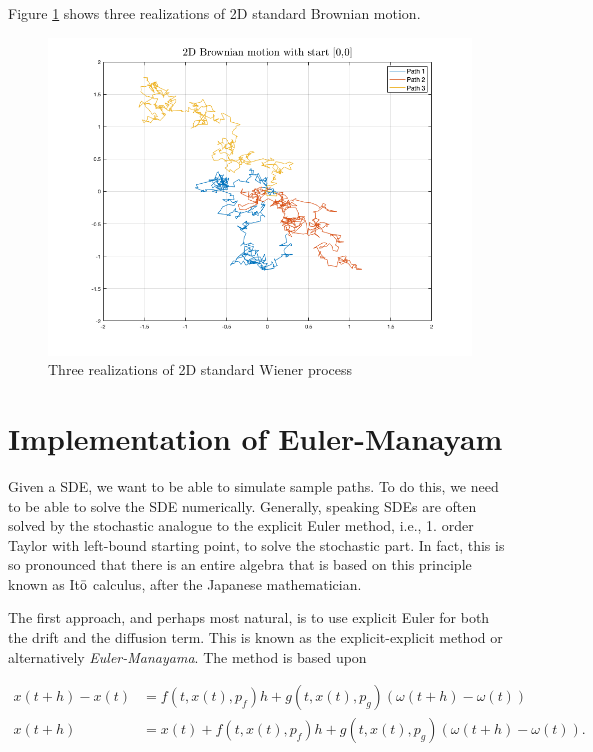 Figure \ref{fig4:2dBM} shows three realizations of 2D standard Brownian motion. 

\begin{figure}[H]
    \centering
    \includegraphics[width=\textwidth]{graphics/opg4/2dBM.png}
    \caption{Three realizations of 2D standard Wiener process}
    \label{fig4:2dBM}
\end{figure}



\section{Implementation of Euler-Manayam}
Given a SDE, we want to be able to simulate sample paths. To do this, we need to be able to solve the SDE numerically. Generally, speaking SDEs are often solved by the stochastic analogue to the explicit Euler method, i.e., 1. order Taylor with left-bound starting point, to solve the stochastic part. In fact, this is so pronounced that there is an entire algebra that is based on this principle known as It$\Bar{\text{o}}$ calculus, after the Japanese mathematician. 

The first approach, and perhaps most natural, is to use explicit Euler for both the drift and the diffusion term. This is known as the explicit-explicit method or alternatively \textit{Euler-Manayama}. The method is based upon

\begin{align}
    x(t+h) - x(t) &= f(t,x(t),p_f)h + g(t,x(t),p_g)(\omega(t+h)-\omega(t)) \\
    x(t+h) &= x(t) + f(t,x(t),p_f)h + g(t,x(t),p_g)(\omega(t+h)-\omega(t)).
\end{align} 

